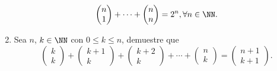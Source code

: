 \begin{enumerate}
$$\begin{pmatrix}
        n \\
        1
    \end{pmatrix} + \cdots + \begin{pmatrix}
        n \\
        n
    \end{pmatrix} = 2^n, \forall n \in \NN.$$
    \item Sea $n$, $k \in \NN$ con $0 \leq k \leq n$, demuestre que
    $$\begin{pmatrix}
        k \\
        k
    \end{pmatrix} + \begin{pmatrix}
        k + 1 \\
        k
    \end{pmatrix} + \begin{pmatrix}
        k + 2 \\
        k
    \end{pmatrix} + \cdots + \begin{pmatrix}
        n \\
        k
    \end{pmatrix} = \begin{pmatrix}
        n + 1 \\
        k + 1
    \end{pmatrix}.$$
\end{enumerate}